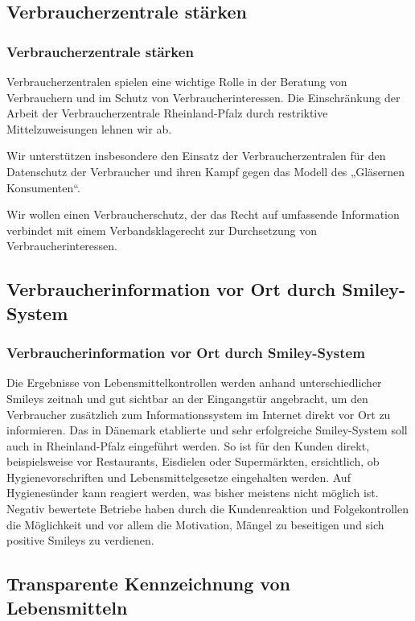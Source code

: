 \subsection*{Verbraucherzentrale stärken}
\subsubsection{Verbraucherzentrale stärken}
\abstimmung
Verbraucherzentralen spielen eine wichtige Rolle in der Beratung von Verbrauchern und im Schutz von Verbraucherinteressen. Die Einschränkung der Arbeit der Verbraucherzentrale Rheinland-Pfalz durch restriktive Mittelzuweisungen lehnen wir ab.

Wir unterstützen insbesondere den Einsatz der Verbraucherzentralen für den Datenschutz der Verbraucher und ihren Kampf gegen das Modell des „Gläsernen Konsumenten“.

Wir wollen einen Verbraucherschutz, der das Recht auf umfassende Information verbindet mit einem Verbandsklagerecht zur Durchsetzung von Verbraucherinteressen.
 
\subsection*{Verbraucherinformation vor Ort durch Smiley-System}
\subsubsection{Verbraucherinformation vor Ort durch Smiley-System}
\abstimmung
Die Ergebnisse von Lebensmittelkontrollen werden anhand unterschiedlicher Smileys zeitnah und gut sichtbar an der Eingangstür angebracht, um den Verbraucher zusätzlich zum Informationssystem im Internet direkt vor Ort zu informieren. Das in Dänemark etablierte und sehr erfolgreiche Smiley-System soll auch in Rheinland-Pfalz eingeführt werden. So ist für den Kunden direkt, beispielsweise vor Restaurants, Eisdielen oder Supermärkten, ersichtlich, ob Hygienevorschriften und Lebensmittelgesetze eingehalten werden. Auf Hygienesünder kann reagiert werden, was bisher meistens nicht möglich ist. Negativ bewertete Betriebe haben durch die Kundenreaktion und Folgekontrollen die Möglichkeit und vor allem die Motivation, Mängel zu beseitigen und sich positive Smileys zu verdienen.
 
\subsection*{Transparente Kennzeichnung von Lebensmitteln}
